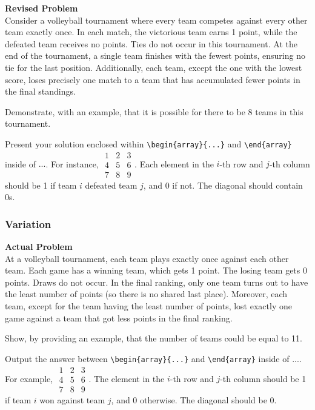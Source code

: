 \textbf{Revised Problem}\\
Consider a volleyball tournament where every team competes against every other team exactly once. In each match, the victorious team earns 1 point, while the defeated team receives no points. Ties do not occur in this tournament. At the end of the tournament, a single team finishes with the fewest points, ensuring no tie for the last position. Additionally, each team, except the one with the lowest score, loses precisely one match to a team that has accumulated fewer points in the final standings.

Demonstrate, with an example, that it is possible for there to be 8 teams in this tournament.

Present your solution enclosed within \verb|\begin{array}{...}| and \verb|\end{array}| inside of $\boxed{...}$. For instance, $\boxed{\begin{array}{ccc}1 & 2 & 3 \\ 4 & 5 & 6 \\ 7 & 8 & 9\end{array}}$. Each element in the $i$-th row and $j$-th column should be 1 if team $i$ defeated team $j$, and 0 if not. The diagonal should contain 0s.

\subsubsection{Variation}
\textbf{Actual Problem}\\
At a volleyball tournament, each team plays exactly once against each other team. Each game has a winning team, which gets 1 point. The losing team gets 0 points. Draws do not occur. In the final ranking, only one team turns out to have the least number of points (so there is no shared last place). Moreover, each team, except for the team having the least number of points, lost exactly one game against a team that got less points in the final ranking.

Show, by providing an example, that the number of teams could be equal to 11.

Output the answer between \verb|\begin{array}{...}| and \verb|\end{array}| inside of $\boxed{...}$. For example, $\boxed{\begin{array}{ccc}1 & 2 & 3 \\ 4 & 5 & 6 \\ 7 & 8 & 9\end{array}}$.
The element in the $i$-th row and $j$-th column should be 1 if team $i$ won against team $j$, and 0 otherwise. The diagonal should be 0.

